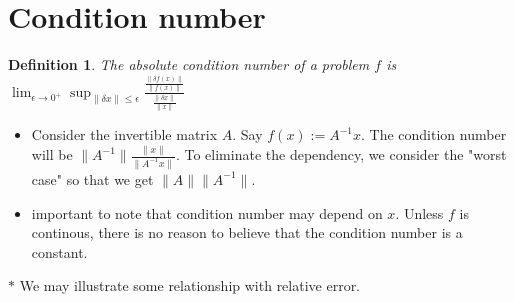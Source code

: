 \documentclass[11pt,reqno]{amsart}
\newtheorem{definition}{Definition}
\theoremstyle{remark}
\begin{document}
\section{Condition number}
\begin{definition}
The absolute condition number of a problem $f$ is \\
$\lim_{\epsilon\to 0^+}\sup_{\lVert\delta x\rVert\leq \epsilon} \frac{\frac{\lVert\delta f(x)\rVert}{\lVert f(x)\rVert}}{\frac{\lVert \delta x\rVert}{\lVert x\rVert}}$
\end{definition}
\begin{itemize}
\item Consider the invertible matrix $A$. Say $f(x):=A^{-1}x$. The condition number will be $\lVert A^{-1}\rVert\frac{\lVert x\rVert}{\lVert A^{-1}x\rVert}$. To eliminate the dependency, we 
consider the "worst case" so that we get $\lVert A\rVert\lVert A^{-1}\rVert$.
\item important to note that condition number may depend on $x$. Unless $f$ is continous, there is no reason to believe that the condition number is a constant.
\end{itemize}
$\ast$ We may illustrate some relationship with relative error.
\end{document}

